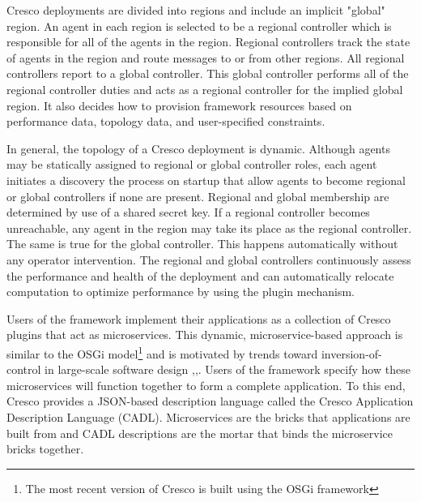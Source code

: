 \documentclass{article}
\begin{document}
	Cresco deployments are divided into regions and include an implicit "global" region. An agent in each region is selected to be a regional controller which is responsible for all of the agents in the region. Regional controllers track the state of  agents in the region and route messages to or from other regions. All regional controllers report to a global controller. This global controller performs all of the regional controller duties and acts as a regional controller for the implied global region. It also decides how to provision framework resources based on performance data, topology data, and user-specified constraints.
	
	In general, the topology of a Cresco deployment is dynamic. Although agents may be statically assigned to regional or global controller roles, each agent initiates a discovery the process on startup that allow agents to become regional or global controllers if none are present. Regional and global membership are determined by use of a shared secret key. If a regional controller becomes unreachable, any agent in the region may take its place as the regional controller. The same is true for the global controller. This happens automatically without any operator intervention. The regional and global controllers continuously assess the performance and health of the deployment and can automatically relocate computation to optimize performance by using the plugin mechanism.
	
    Users of the framework implement their applications as a collection of Cresco plugins that act as microservices. This dynamic, microservice-based approach is similar to the OSGi model\footnote{The most recent version of Cresco is built using the OSGi framework} and is motivated by trends toward inversion-of-control in large-scale software design \cite{osgi},\cite{spring},\cite{kubernetes}. Users of the framework specify how these microservices will function together to form a complete application. To this end, Cresco provides a JSON-based description language called the Cresco Application Description Language (CADL). Microservices are the bricks that applications are built from and CADL descriptions are the mortar that binds the microservice bricks together.
    
\end{document}
